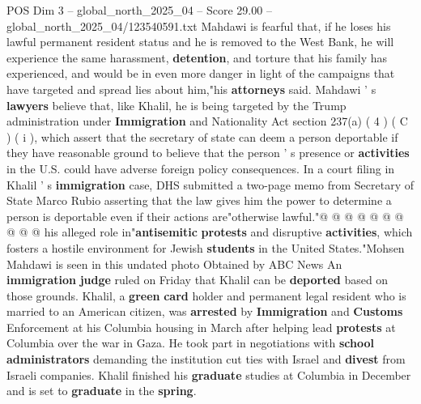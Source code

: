 \begin{textsample}{POS Dim 3 – global\_north\_2025\_04 – Score 29.00 – global\_north\_2025\_04/123540591.txt}
Mahdawi is fearful that, if he loses his lawful permanent resident status and he is removed to the West Bank, he will experience the same harassment, \textbf{detention}, and torture that his family has experienced, and would be in even more danger in light of the campaigns that have targeted and spread lies about him,"his \textbf{attorneys} said.
Mahdawi ' s \textbf{lawyers} believe that, like Khalil, he is being targeted by the Trump administration under \textbf{Immigration} and Nationality Act section 237(a) ( 4 ) ( C ) ( i ), which assert that the secretary of state can deem a person deportable if they have reasonable ground to believe that the person ' s presence or \textbf{activities} in the U.S. could have adverse foreign policy consequences.
In a court filing in Khalil ' s \textbf{immigration} case, DHS submitted a two-page memo from Secretary of State Marco Rubio asserting that the law gives him the power to determine a person is deportable even if their actions are"otherwise lawful."@ @ @ @ @ @ @ @ @ @ his alleged role in"\textbf{antisemitic} \textbf{protests} and disruptive \textbf{activities}, which fosters a hostile environment for Jewish \textbf{students} in the United States."Mohsen Mahdawi is seen in this undated photo Obtained by ABC News An \textbf{immigration} \textbf{judge} ruled on Friday that Khalil can be \textbf{deported} based on those grounds.
Khalil, a \textbf{green} \textbf{card} holder and permanent legal resident who is married to an American citizen, was \textbf{arrested} by \textbf{Immigration} and \textbf{Customs} Enforcement at his Columbia housing in March after helping lead \textbf{protests} at Columbia over the war in Gaza.
He took part in negotiations with \textbf{school} \textbf{administrators} demanding the institution cut ties with Israel and \textbf{divest} from Israeli companies.
Khalil finished his \textbf{graduate} studies at Columbia in December and is set to \textbf{graduate} in the \textbf{spring}.

\end{textsample}
